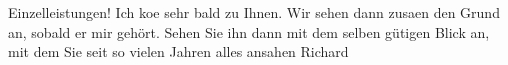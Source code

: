 \begin{ledgroupsized}[t]{13cm}
               Einzelleistungen!\pend
           \pstart
           Ich ko{\geminationm}e sehr bald zu Ihnen. Wir sehen dann zusa{\geminationm}en den Grund an, sobald er mir gehört. Sehen Sie ihn
               dann mit dem selben gütigen Blick an, mit dem Sie seit so vielen Jahren alles ansahen
                  \label{T_L01519_1v}\label{T_L01519_1h}\spacefill\mbox{Richard}\pend
           \endnumbering{}\end{ledgroupsized}  \newcommand{\dateiname}{L01519}\newcommand{\titel}{Richard Beer-Hofmann an Arthur Schnitzler, 25. 5. 1905}\newcommand{\editorInnen}{Martin Anton Müller und Gerd-Hermann Susen}
            \footnotesize
\begin{ledgroupsized}[t]{11.5cm}
\end{ledgroupsized}
         
      
